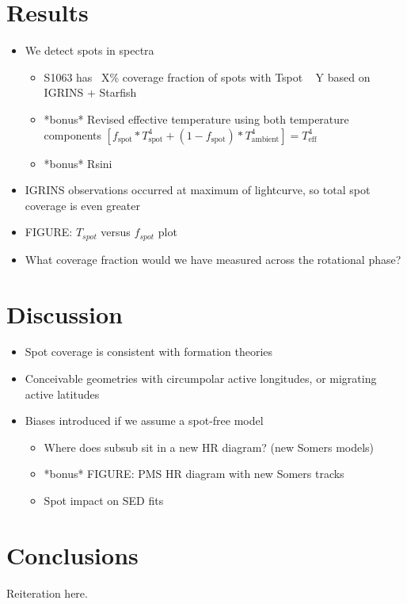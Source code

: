 \documentclass[twocolumn]{emulateapj}%
\begin{document}
\section{Results}
\begin{itemize}
\item We detect spots in spectra
\begin{itemize}
  \item S1063 has ~X\% coverage fraction of spots with Tspot ~ Y based on IGRINS + Starfish
  \item *bonus* Revised effective temperature using both temperature components $[f_{\textrm{spot}} * T_{\textrm{spot}}^4 + (1 -f_{\textrm{spot}}) * T_{\textrm{ambient}}^4] = T_{\textrm{eff}}^4$
  \item *bonus* Rsini
\end{itemize}
\item IGRINS observations occurred at maximum of lightcurve, so total spot coverage is even greater
\item FIGURE: $T_{spot}$ versus $f_{spot}$ plot
\item What coverage fraction would we have measured across the rotational phase?
\end{itemize}

\section{Discussion}
\begin{itemize}
\item Spot coverage is consistent with formation theories
\item Conceivable geometries with circumpolar active longitudes, or migrating active latitudes
\item Biases introduced if we assume a spot-free model
\begin{itemize}
  \item Where does subsub sit in a new HR diagram? (new Somers models)
  \item *bonus* FIGURE: PMS HR diagram with new Somers tracks
  \item Spot impact on SED fits
\end{itemize}
\end{itemize}

\section{Conclusions}

Reiteration here.
\end{document}
